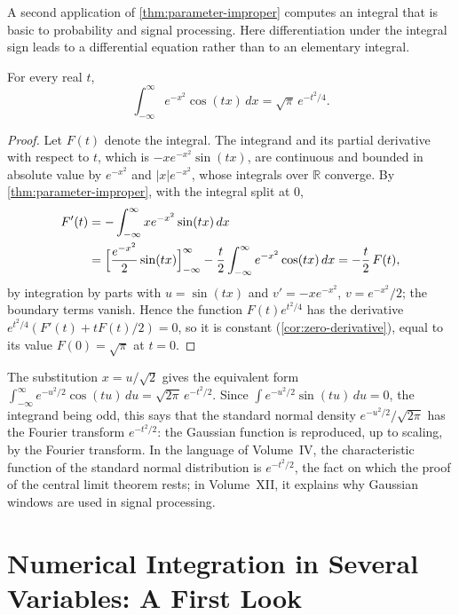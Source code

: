 A second application of \cref{thm:parameter-improper} computes an integral that is basic to probability and signal processing. Here differentiation under the integral sign leads to a differential equation rather than to an elementary integral.

\begin{proposition}
\label{prop:gaussian-fourier}
For every real $t$,
\[
\int_{-\infty}^\infty e^{-x^2}\cos(tx)\,dx=\sqrt\pi\,e^{-t^2/4} .
\]
\end{proposition}

\begin{proof}
Let $F(t)$ denote the integral. The integrand and its partial derivative with respect to $t$, which is $-xe^{-x^2}\sin(tx)$, are continuous and bounded in absolute value by $e^{-x^2}$ and $|x|e^{-x^2}$, whose integrals over $\mathbb R$ converge. By \cref{thm:parameter-improper}, with the integral split at $0$,
\[
\begin{aligned}
F'(t)&=-\int_{-\infty}^\infty xe^{-x^2}\sin(tx)\,dx\\
&=\Bigl[\frac{e^{-x^2}}2\sin(tx)\Bigr]_{-\infty}^\infty-\frac t2\int_{-\infty}^\infty e^{-x^2}\cos(tx)\,dx=-\frac t2\,F(t),
\end{aligned}
\]
by integration by parts with $u=\sin(tx)$ and $v'=-xe^{-x^2}$, $v=e^{-x^2}/2$; the boundary terms vanish. Hence the function $F(t)e^{t^2/4}$ has the derivative $e^{t^2/4}(F'(t)+tF(t)/2)=0$, so it is constant (\cref{cor:zero-derivative}), equal to its value $F(0)=\sqrt\pi$ at $t=0$.
\end{proof}

The substitution $x=u/\sqrt2$ gives the equivalent form $\int_{-\infty}^\infty e^{-u^2/2}\cos(tu)\,du=\sqrt{2\pi}\,e^{-t^2/2}$. Since $\int e^{-u^2/2}\sin(tu)\,du=0$, the integrand being odd, this says that the standard normal density $e^{-u^2/2}/\sqrt{2\pi}$ has the Fourier transform $e^{-t^2/2}$: the Gaussian function is reproduced, up to scaling, by the Fourier transform. In the language of Volume~IV, the characteristic function of the standard normal distribution is $e^{-t^2/2}$, the fact on which the proof of the central limit theorem rests; in Volume~XII, it explains why Gaussian windows are used in signal processing.

\section{Numerical Integration in Several Variables: A First Look}
\label{sec:cubature}

